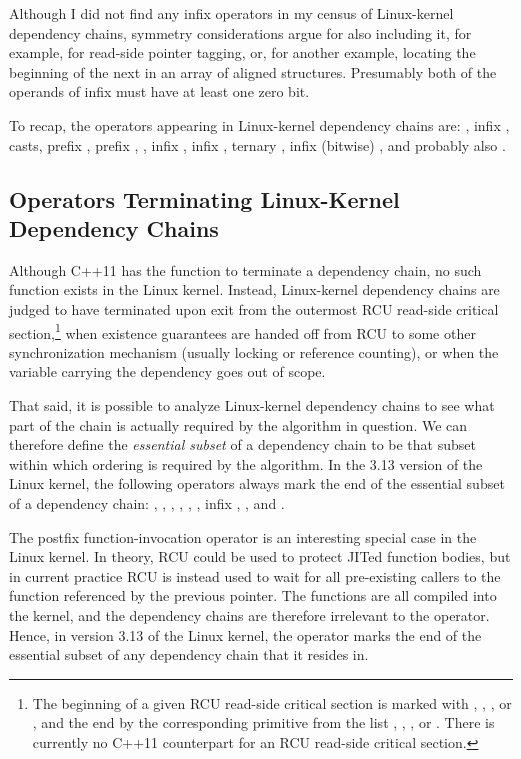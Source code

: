 \documentclass[letterpaper,twocolumn,10pt]{article}
\begin{document}
Although I did not find any infix \co{|} operators in my census of
Linux-kernel dependency chains,
symmetry considerations argue for also including it, for example, for
read-side pointer tagging, or, for another example, locating the beginning
of the next in an array of aligned structures.
Presumably both of the operands of infix \co{|} must have at least one
zero bit.

To recap, the operators appearing in Linux-kernel dependency chains are:
\co{->}, infix \co{=}, casts, prefix \co{&}, prefix \co{*}, \co{[]},
infix \co{+}, infix \co{-}, ternary , infix (bitwise) \co{&},
and probably also \co{|}.

\subsection{Operators Terminating Linux-Kernel Dependency Chains}
\label{sec:Operators Terminating Linux-Kernel Dependency Chains}

Although C++11 has the  function to terminate
a dependency chain, no such function exists in the Linux kernel.
Instead, Linux-kernel dependency chains are judged to have terminated
upon exit from the outermost RCU read-side critical section,\footnote{
	The beginning of a given RCU read-side critical section is marked
	with , ,
	, or ,
	and the end by the corresponding primitive from the list
	, ,
	, or .
	There is currently no C++11 counterpart for an RCU read-side
	critical section.}
when existence guarantees are handed off from RCU to some other
synchronization mechanism (usually locking or reference counting),
or when the variable carrying the dependency goes out of scope.

That said, it is possible to analyze Linux-kernel dependency chains
to see what part of the chain is actually required by the algorithm
in question.
We can therefore define the \emph{essential subset} of a dependency chain
to be that subset within which ordering is required by the algorithm.
In the 3.13 version of the Linux kernel, the following operators
always mark the end of the essential subset of a dependency chain:
\co{()}, \co{!}, \co{==}, \co{!=}, \co{&&}, \co{||}, infix \co{*}, \co{/},
and \co{\%}.

The postfix \co{()} function-invocation operator is an interesting special
case in the Linux kernel.
In theory, RCU could be used to protect JITed function bodies, but in
current practice RCU is instead used to wait for all pre-existing
callers to the function referenced by the previous pointer.
The functions are all compiled into the kernel, and the dependency
chains are therefore irrelevant to the \co{()} operator.
Hence, in version 3.13 of the Linux kernel, the \co{()} operator
marks the end of the essential subset of any dependency chain that
it resides in.
\end{document}

